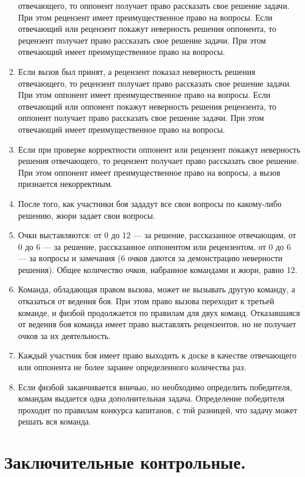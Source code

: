 \documentclass[11pt]{article}
\begin{document}
\begin{enumerate}
  отвечающего, то оппонент получает право рассказать свое решение
  задачи. При этом рецензент имеет преимущественное право на
  вопросы. Если отвечающий или рецензент покажут неверность решения
  оппонента, то рецензент получает право рассказать свое решение
  задачи. При этом отвечающий имеет преимущественное право на вопросы.
\item Если вызов был принят, а рецензент показал неверность решения
  отвечающего, то рецензент получает право рассказать свое решение
  задачи. При этом оппонент имеет преимущественное право на
  вопросы. Если отвечающий или оппонент покажут неверность решения
  рецензента, то оппонент получает право рассказать свое решение
  задачи. При этом отвечающий имеет преимущественное право на вопросы.
\item Если при проверке корректности оппонент или рецензент покажут
  неверность решения отвечающего, то рецензент получает право
  рассказать свое решение. При этом оппонент имеет преимущественное
  право на вопросы, а вызов признается некорректным.
\item После того, как участники боя зададут все свои вопросы по
  какому-либо решению, жюри задает свои вопросы.
\item Очки выставляются: от 0 до 12 --- за решение, рассказанное
  отвечающим, от 0 до 6 --- за решение, рассказанное оппонентом или
  рецензентом, от 0 до 6 --- за вопросы и замечания (6 очков даются за
  демонстрацию неверности решения). Общее количество очков, набранное
  командами и жюри, равно 12.
\item Команда, обладающая правом вызова, может не вызывать другую
  команду, а отказаться от ведения боя. При этом право вызова
  переходит к третьей команде, и физбой продолжается по правилам для
  двух команд. Отказавшаяся от ведения боя команда имеет право
  выставлять рецензентов, но не получает очков за их деятельность.
\item Каждый участник боя имеет право выходить к доске в качестве
  отвечающего или оппонента не более заранее определенного количества
  раз.
\item Если физбой заканчивается вничью, но необходимо определить
  победителя, командам выдается одна дополнительная
  задача. Определение победителя проходит по правилам конкурса
  капитанов, с той разницей, что задачу может решать вся команда.
\end{enumerate}
\restoregeometry
\clearpage

\section{Заключительные контрольные.}
\label{sec:final}
\end{document}
